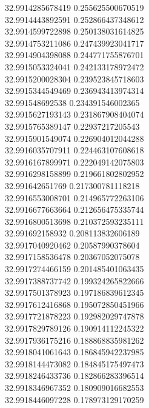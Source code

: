 {32.9914285678419	0.255625500670519\\
32.9914443892591	0.252866437348612\\
32.9914599722898	0.250138031614825\\
32.9914753211086	0.247439923041717\\
32.9914904398088	0.244771755876701\\
32.9915053324041	0.242133178972472\\
32.9915200028304	0.239523845718603\\
32.9915344549469	0.236943413974314\\
32.991548692538	0.234391546002365\\
32.9915627193143	0.231867908404074\\
32.9915765389147	0.22937217205543\\
32.9915901549074	0.226904012044288\\
32.9916035707911	0.224463107608618\\
32.9916167899971	0.222049142075803\\
32.9916298158899	0.219661802802952\\
32.991642651769	0.217300781118218\\
32.9916553008701	0.214965772263106\\
32.9916677663664	0.212656475335744\\
32.9916800513698	0.210372593235111\\
32.991692158932	0.208113832606189\\
32.9917040920462	0.20587990378604\\
32.9917158536478	0.20367052075078\\
32.9917274466159	0.201485401063435\\
32.9917388737742	0.199324265822666\\
32.9917501378923	0.197186839612345\\
32.9917612416868	0.195072850451966\\
32.9917721878223	0.192982029747878\\
32.9917829789126	0.190914112245322\\
32.9917936175216	0.188868835981262\\
32.9918041061643	0.186845942237985\\
32.9918144473082	0.184845175497473\\
32.9918246433736	0.182866283396514\\
32.9918346967352	0.180909016682553\\
32.9918446097228	0.178973129170259\\
}
